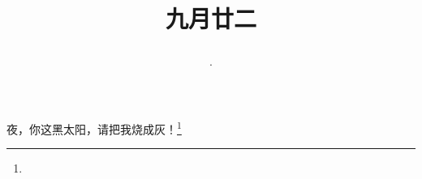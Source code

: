 \title{\date[d=24,m=10,y=2024][year:cn-y,年,month:cn,day:cn,日,·,weekday]·九月廿二 }
夜，你这黑太阳，请把我烧成灰！\footnote{ }

